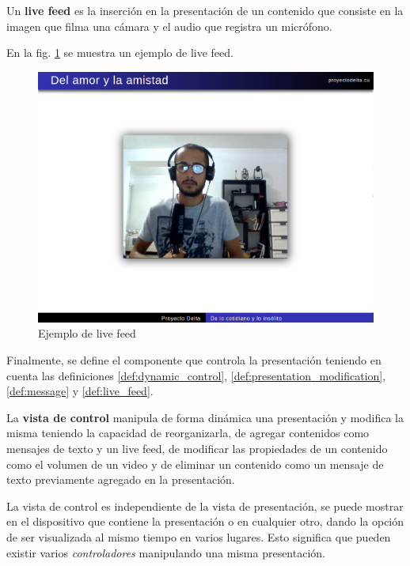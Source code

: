		\begin{definition}
		\label{def:live_feed}
			Un \textbf{live feed} es la inserción en la presentación de un contenido que consiste en la imagen que filma una cámara y el audio que registra un micrófono.
		\end{definition}

		En la fig. \ref{fig:live_feed} se muestra un ejemplo de live feed.

		\begin{figure}[tb]
			\centering
			\includegraphics[width=12cm]{img/live_feed}
			\caption{Ejemplo de live feed}
			\label{fig:live_feed}
		\end{figure}

		Finalmente, se define el componente que controla la presentación teniendo en cuenta las definiciones \ref{def:dynamic_control}, \ref{def:presentation_modification}, \ref{def:message} y \ref{def:live_feed}.

		\begin{definition}
		\label{def:control_view}
			La \textbf{vista de control} manipula de forma dinámica una presentación y modifica la misma teniendo la capacidad de reorganizarla, de agregar contenidos como mensajes de texto y un live feed, de modificar las propiedades de un contenido como el volumen de un video y de eliminar un contenido como un mensaje de texto previamente agregado en la presentación. 
		\end{definition}		
		
		La vista de control es independiente de la vista de presentación, se puede mostrar en el dispositivo que contiene la presentación o en cualquier otro, dando la opción de ser visualizada al mismo tiempo en varios lugares. Esto significa que pueden existir varios \textit{controladores} manipulando una misma presentación.

